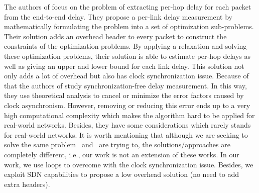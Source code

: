 \documentclass[10pt, journal, letterpaper]{IEEEtran}
\begin{document}



The authors of \cite{gao2016accurate} focus on the problem of extracting per-hop delay for each packet from the end-to-end delay. They propose a per-link delay measurement by mathematically formulating the problem into a set of optimization sub-problems. Their solution adds an overhead header to every packet to construct the constraints of the optimization problems. By applying a relaxation and solving these optimization problems, their solution is able to estimate per-hop delays as well as giving an upper and lower bound for each link delay. This solution not only adds a lot of overhead but also has clock synchronization issue. Because of that the authors of \cite{nakanishi2018route} study synchronization-free delay measurement. In this way, they use theoretical analysis to cancel or minimize the error factors caused by clock asynchronism. However, removing or reducing this error ends up to a very high computational complexity which makes the algorithm hard to be applied for real-world networks. Besides, they have some considerations which rarely stands for real-world networks. It is worth mentioning that although we are seeking to solve the same problem \cite{gao2016accurate}~and~\cite{nakanishi2018route} are trying to, the solutions/approaches are completely different, i.e., our work is not an extension of these works. In our work, we use loops to overcome with the clock synchronization issue. Besides, we exploit SDN capabilities to propose a low overhead solution (no need to add extra headers).
\end{document}
